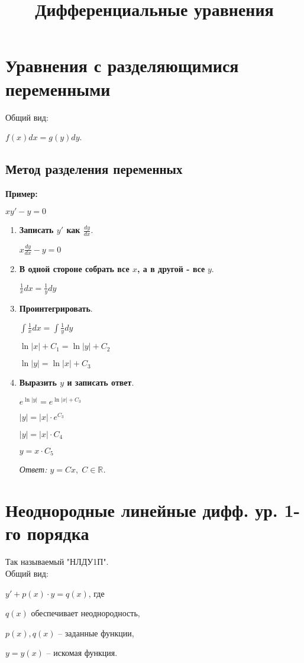 \documentclass[10pt, a4paper]{article}
\title{Дифференциальные уравнения}
\author{}
\date{}
\begin{document}
\maketitle

\tableofcontents

\newpage

\section{Уравнения с разделяющимися переменными}
Общий вид:
\par $f(x)dx = g(y)dy$.

\subsection{Метод разделения переменных}
\textbf{Пример:}
\par $xy' - y = 0$
\begin{enumerate}
    \item \textbf{Записать $y'$ как $\frac{dy}{dx}$}.
        \par $x\frac{dy}{dx} - y = 0$
    \item \textbf{В одной стороне собрать все $x$, а в другой - все} $y$.
        \par $\frac{1}{x}dx = \frac{1}{y}dy$
    \item \textbf{Проинтегрировать}.
        \par $\int\frac{1}{x}dx = \int\frac{1}{y}dy$
        \par $\ln|x| + C_{1} = \ln|y| + C_{2}$
        \par $\ln|y| = \ln|x| + C_{3}$
    \item \textbf{Выразить $y$ и записать ответ}.
        \par $e^{\ln|y|} = e^{\ln|x| + C_{3}}$
        \par $|y| = |x| \cdot e^{C_{3}}$
        \par $|y| = |x| \cdot C_{4}$
        \par $y = x \cdot C_{5}$
        \par \textit{Ответ: $y = Cx, \; C \in \mathbb{R}$.}
\end{enumerate}


\section{Неоднородные линейные дифф. ур. 1-го порядка}
Так называемый "НЛДУ1П". \\
Общий вид:
\par $y' + p(x) \cdot y = q(x)$, где
\par $q(x)$ обеспечивает неоднородность,
\par $p(x), q(x)$ -- заданные функции,
\par $y = y(x)$ -- искомая функция.
\end{document}
